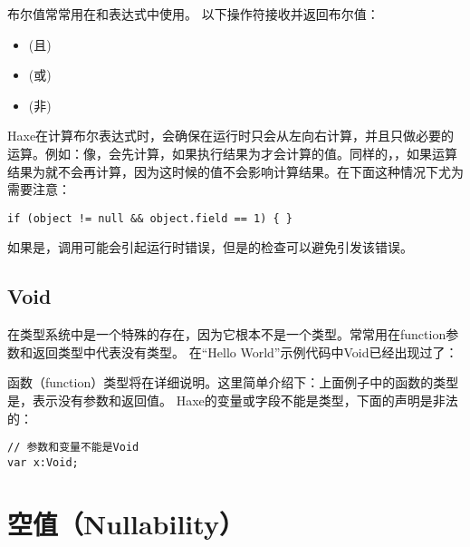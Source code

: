 布尔值常常用在和表达式中使用。
以下操作符接收并返回布尔值：

\begin{itemize}
	\item \expr{\&\&} (且)
	\item \expr{||} (或)
	\item \expr{!} (非)
\end{itemize}

Haxe在计算布尔表达式时，会确保在运行时只会从左向右计算，并且只做必要的运算。例如：像，会先计算，如果执行结果为才会计算的值。同样的，，如果运算结果为就不会再计算，因为这时候的值不会影响计算结果。在下面这种情况下尤为需要注意：

\begin{lstlisting}
if (object != null && object.field == 1) { }
\end{lstlisting}

如果是，调用可能会引起运行时错误，但是的检查可以避免引发该错误。

\subsection{Void}
\label{types-void}


在类型系统中是一个特殊的存在，因为它根本不是一个类型。常常用在function参数和返回类型中代表没有类型。
在“Hello World”示例代码中Void已经出现过了：


函数（function）类型将在详细说明。这里简单介绍下：上面例子中的函数的类型是，表示没有参数和返回值。
Haxe的变量或字段不能是类型，下面的声明是非法的：

\begin{lstlisting}
// 参数和变量不能是Void
var x:Void;
\end{lstlisting}

\section{空值（Nullability）}
\label{types-nullability}


